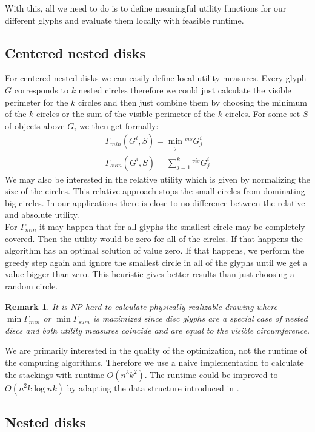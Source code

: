 \documentclass[a4paper,11pt]{article}
\newtheorem*{remark}{Remark}
\begin{document}
With this, all we need to do is to define meaningful utility functions for our different glyphs and evaluate them locally with feasible runtime.

\subsection{Centered nested disks}
For centered nested disks we can easily define local utility measures. Every glyph $G$ corresponds to $k$ nested circles therefore we could just calculate the visible perimeter for the $k$ circles and then just combine them by choosing the minimum of the $k$ circles or the sum of the visible perimeter of the $k$ circles. For some set $S$ of objects above $G_i$ we then get formally:
\begin{align*}
  \Gamma_{min}({G^i,S})=\min_j  {^{vis} G^i_j} \\
  \Gamma_{sum}({G^i,S})=\sum_{j=1}^k  {^{vis} G^i_j}
\end{align*}
We may also be interested in the relative utility which is given by normalizing the size of the circles. This relative approach stops the small circles from dominating big circles. In our applications there is close to no difference between the relative and absolute utility.\\

For $\Gamma_{min}$ it may happen that for all glyphs the smallest circle may be completely covered. Then the utility would be zero for all of the circles. If that happens the algorithm has an optimal solution of value zero. If that happens, we perform the greedy step again and ignore the smallest circle in all of the glyphs until we get a value bigger than zero. This heuristic gives better results than just choosing a random circle.\\
%
\begin{remark}
It is NP-hard to calculate physically realizable drawing where $\min\Gamma_{min}$ or $\min\Gamma_{sum}$ is maximized since disc glyphs are a special case of nested discs and both utility measures coincide and are equal to the visible circumference.
\end{remark}
We are primarily interested in the quality of the optimization, not the runtime of the computing algorithms. Therefore we use a naive implementation to calculate the stackings with runtime $O(n^3k^2)$. The runtime could be improved to $O(n^2k \log nk)$ by adapting the data structure introduced in \cite{caballo}.


\subsection{Nested disks}
\end{document}
